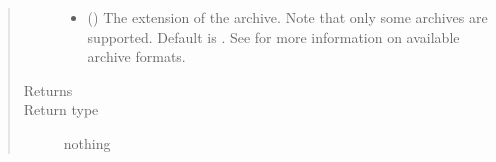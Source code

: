 \documentclass[letterpaper,10pt,english]{sphinxmanual}
\begin{document}
\begin{fulllineitems}
\begin{quote}
\begin{description}
\begin{itemize}
\item {} 
 (\sphinxstyleliteralemphasis{\sphinxupquote{ (}}\sphinxstyleliteralemphasis{\sphinxupquote{)}}) \textendash{} The extension of the archive. Note that only some archives are
supported. Default is . See
 for more information on
available archive formats.

\end{itemize}

\item[{Returns}] \leavevmode


\item[{Return type}] \leavevmode
nothing

\end{description}\end{quote}

\end{fulllineitems}

\end{document}
